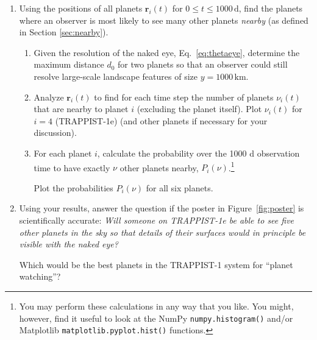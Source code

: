 \documentclass[letterpaper]{scrartcl}
\newenvironment{enuma}{\begin{enumerate}[label=(\alph*)]}{\end{enumerate}}
\newenvironment{enumi}{\begin{enumerate}[label=(\roman*)]}{\end{enumerate}}
\renewcommand{\vec}[1]{\ensuremath{\mathbf{#1}}}
\begin{document}
\begin{enuma}
\begin{enumi}
    the planets). Assume an observer looks side on the system along
    the $y$-direction. Compute a time series of the $y$-component of
    the velocity of the star $\vec{v}_{*}$ in the observer's frame of
    reference (transform from center-of-mass frame to lab frame of
    reference):
    \begin{gather}
      \label{eq:vstarlabframe}
      \vec{v}_{*} - \frac{\sum_{i=1}^{N_{\text{planets}}}
        m_{i}}{M_{\text{star}} + \sum_{i=1}^{N_{\text{planets}}} m_{i}}\vec{v}
    \end{gather}
    Compare the changes to the resolution of current Doppler
    spectrometers (about 1 m/s). Would the wobble be detectable?
  \end{enumi}
\item Using the positions of all planets $\vec{r}_{i}(t)$ for $0 \leq
  t \leq 1000\,\text{d}$, find the planets where an observer is most
  likely to see many other planets \emph{nearby} (as defined in Section
  \ref{sec:nearby}).
  \begin{enumi}    
  \item Given the resolution of the naked eye, Eq.~\ref{eq:thetaeye},
    determine the maximum distance $d_{0}$ for two planets so that an
    observer could still resolve large-scale landscape features of
    size $y = 1000\,\text{km}$.
  \item Analyze $\vec{r}_{i}(t)$ to find for each time step the number
    of planets $\nu_{i}(t)$ that are nearby to planet $i$ (excluding
    the planet itself). Plot $\nu_{i}(t)$ for $i=4$ (TRAPPIST-1e) (and
    other planets if necessary for your discussion).
  \item For each planet $i$, calculate the probability over the 1000 d
    observation time to have exactly $\nu$ other planets nearby,
    $P_{i}(\nu)$.\footnote{You may perform these calculations in any
      way that you like. You might, however, find it useful to look at
      the NumPy \texttt{numpy.histogram()} and/or Matplotlib
      \texttt{matplotlib.pyplot.hist()} functions.} 
    
    Plot the probabilities $P_{i}(\nu)$ for all six planets. 
  \end{enumi}
\item Using your results, answer the question if the poster in
  Figure~\ref{fig:poster} is scientifically accurate: \emph{Will
    someone on TRAPPIST-1e be able to see five other planets in the
    sky so that details of their surfaces would in principle be
    visible with the naked eye?}

  Which would be the best planets in the TRAPPIST-1 system for
  ``planet watching''?
\end{enuma}
\end{document}

